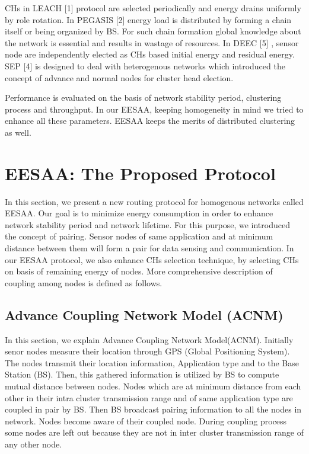 \documentclass[journal]{IEEEtran}
\begin{document}
CHs in LEACH [1] protocol are selected periodically and energy drains uniformly by role rotation. In PEGASIS [2] energy load is distributed by forming a chain itself or being organized by BS. For such chain formation global knowledge about the network is essential and results in wastage of resources. In DEEC [5] , sensor node are independently elected as CHs based initial energy and residual energy. SEP [4] is designed to deal with heterogenous networks which introduced the concept of advance and normal nodes for cluster head election.

Performance is evaluated on the basis of network stability period, clustering process and throughput. In our EESAA, keeping homogeneity in mind we tried to enhance all these parameters. EESAA keeps the merits of distributed clustering as well.

\section{EESAA: The Proposed Protocol}
In this section, we present a new routing protocol for homogenous networks called EESAA. Our goal is to minimize energy consumption in order to enhance network stability period and network lifetime. For this purpose, we introduced the concept of pairing. Sensor nodes of same application and at minimum distance between them will form a pair for data sensing and communication. In our EESAA protocol, we also enhance CHs selection technique, by selecting CHs on basis of remaining energy of nodes. More comprehensive description of coupling among nodes is defined as follows.

\subsection{Advance Coupling Network Model (ACNM)}
In this section, we explain Advance Coupling Network Model(ACNM). Initially senor nodes measure their location through GPS (Global Positioning System). The nodes transmit their location information, Application type and  to the Base Station (BS). Then, this gathered information is utilized by BS to compute mutual distance between nodes. Nodes which are at minimum distance from each other in their intra cluster transmission range and of same application type are coupled in pair by BS. Then BS broadcast pairing information to all the nodes in network. Nodes become aware of their coupled node. During coupling process some nodes are left out because they are not in inter cluster transmission range of any other node.
\end{document}
